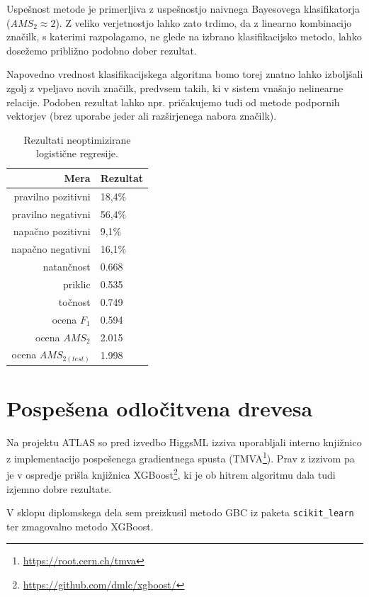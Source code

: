 \documentclass[11pt,a4paper,openany]{book}
\begin{document}
Uspešnost metode je primerljiva z uspešnostjo naivnega Bayesovega klasifikatorja ($AMS_2 \approx 2$). Z veliko verjetnostjo lahko zato trdimo, da z linearno kombinacijo značilk, s katerimi razpolagamo, ne glede na izbrano klasifikacijsko metodo, lahko dosežemo približno podobno dober rezultat.

Napovedno vrednost klasifikacijskega algoritma bomo torej znatno lahko izboljšali zgolj z vpeljavo novih značilk, predvsem takih, ki v sistem vnašajo nelinearne relacije. Podoben rezultat lahko npr. pričakujemo tudi od metode podpornih vektorjev (brez uporabe jeder ali razširjenega nabora značilk).

\begin{table}[h!]
	\centering
	\begin{tabular}{rl}
		\hline
		\textbf{Mera} & \textbf{Rezultat} \\
		\hline
		pravilno pozitivni & 18,4\%\\
		pravilno negativni & 56,4\% \\
		napačno pozitivni & 9,1\% \\
		napačno negativni & 16,1\% \\
		natančnost & 0.668 \\
		priklic & 0.535 \\
		točnost & 0.749 \\
		ocena $F_1$ & 0.594 \\
		ocena $AMS_2$ & 2.015 \\
		ocena $AMS_{2(test)}$ & 1.998 		
	\end{tabular}
	\caption{Rezultati neoptimizirane logistične regresije.}
	\label{tb:logisticna}
\end{table}


\section{Pospešena odločitvena drevesa}

Na projektu ATLAS so pred izvedbo HiggsML izziva uporabljali interno knjižnico z implementacijo pospešenega gradientnega spusta (TMVA\footnote{\url{https://root.cern.ch/tmva}}). Prav z izzivom pa je v ospredje prišla knjižnica XGBoost\footnote{\url{https://github.com/dmlc/xgboost/}}, ki je ob hitrem algoritmu dala tudi izjemno dobre rezultate.

V sklopu diplomskega dela sem preizkusil metodo GBC iz paketa \texttt{scikit\_learn} ter zmagovalno metodo XGBoost.
\end{document}
